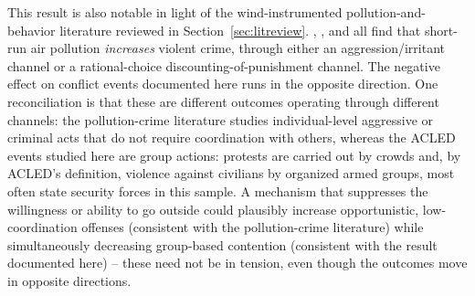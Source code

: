 \documentclass[12pt]{article}
\begin{document}
This result is also notable in light of the wind-instrumented pollution-and-behavior literature reviewed in Section~\ref{sec:litreview}. \citet{herrnstadt2021}, \citet{bondyrothsager2020}, and \citet{burkhardt2019} all find that short-run air pollution \emph{increases} violent crime, through either an aggression/irritant channel or a rational-choice discounting-of-punishment channel. The negative effect on conflict events documented here runs in the opposite direction. One reconciliation is that these are different outcomes operating through different channels: the pollution-crime literature studies individual-level aggressive or criminal acts that do not require coordination with others, whereas the ACLED events studied here are group actions: protests are carried out by crowds and, by ACLED's definition, violence against civilians by organized armed groups, most often state security forces in this sample. A mechanism that suppresses the willingness or ability to go outside could plausibly increase opportunistic, low-coordination offenses (consistent with the pollution-crime literature) while simultaneously decreasing group-based contention (consistent with the result documented here) -- these need not be in tension, even though the outcomes move in opposite directions.
\end{document}
